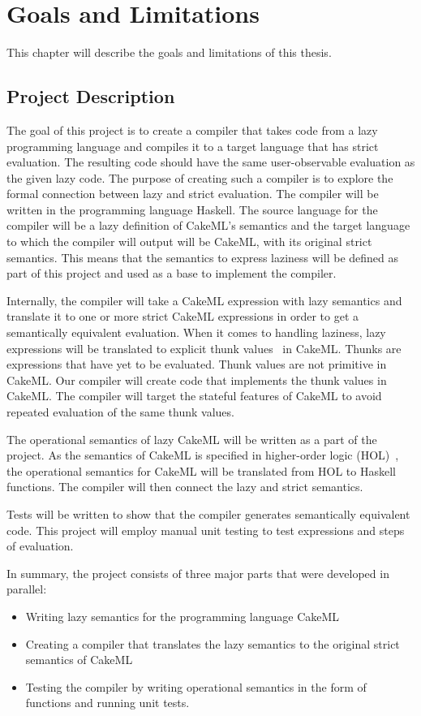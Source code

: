 \chapter{Goals and Limitations}
This chapter will describe the goals and limitations of this thesis.

\section{Project Description}
\label{intro:project}
The goal of this project is to create a compiler that takes code from a lazy
programming language and compiles it to a target language that has strict
evaluation. The resulting code should have the same user-observable evaluation
as the given lazy code.
The purpose of creating such a compiler is to explore the formal
connection between lazy and strict evaluation. The compiler will be written in
the programming language Haskell. The source language for the compiler will be
a lazy definition of CakeML's semantics and the target language to which the
compiler will output will be CakeML, with its original strict semantics. This
means that the semantics to express laziness will be defined as part of this
project and used as a base to implement the compiler.

Internally, the compiler will take a
CakeML expression with lazy semantics and translate it to one
or more strict CakeML expressions in order to get a semantically equivalent
evaluation. When it comes to handling laziness, lazy expressions will be
translated to explicit thunk values~\cite{Ingerman:1961:TWC:366062.366084} in
CakeML. Thunks are expressions that have yet to be evaluated. Thunk values are
not primitive in CakeML. Our compiler will create code that
implements the thunk values in CakeML. The compiler will target the stateful
features of CakeML to avoid repeated evaluation of the same thunk values.

The operational semantics of lazy CakeML will be written as a part of the
project. As the semantics of CakeML is specified in higher-order logic
(HOL)~\cite{HOLInter57:online},
the operational semantics for CakeML will be translated from HOL to Haskell
functions. The compiler will then connect the lazy and strict semantics.

Tests will be written to show that the compiler generates semantically
equivalent code. This project will employ manual unit testing to test
expressions and steps of evaluation.

In summary, the project consists of three major parts that were developed
in parallel:
\begin{itemize}
 \item Writing lazy semantics for the programming language CakeML
 \item Creating a compiler that translates the lazy semantics to the original strict semantics of CakeML
 \item Testing the compiler by writing operational semantics in the form of functions and running unit tests.
\end{itemize}


